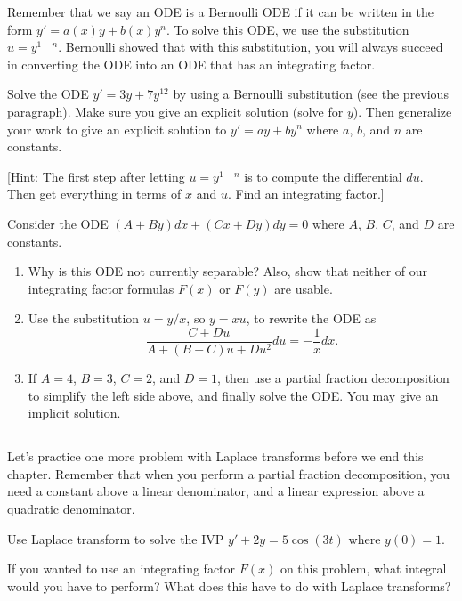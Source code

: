 Remember that we say an ODE is a Bernoulli ODE if it can be written in the form $y'=a(x) y +b(x) y^n$.  To solve this ODE, we use the substitution $u=y^{1-n}$. Bernoulli showed that with this substitution, you will always succeed in converting the ODE into an ODE that has an integrating factor. 
\begin{problem}
Solve the ODE $y'=3y+7y^{12}$ by using a Bernoulli substitution (see the previous paragraph). Make sure you give an explicit solution (solve for $y$). Then generalize your work to give an explicit solution to $y'=ay+by^n$ where $a$, $b$, and $n$ are constants. 

[Hint: The first step after letting  $u=y^{1-n}$ is to compute the differential $du$. Then get everything in terms of $x$ and $u$. Find an integrating factor.]
\end{problem}


\begin{problem}
Consider the ODE $(A+By)dx+(Cx+Dy)dy=0$ where $A$, $B$, $C$, and $D$ are constants. 
\begin{enumerate}
 \item Why is this ODE not currently separable? Also, show that neither of our integrating factor formulas $F(x)$ or $F(y)$ are usable. 
 \item Use the substitution $u=y/x$, so $y=xu$, to rewrite the ODE as 
$$\frac{C+Du}{A+(B+C)u+Du^2}du=-\frac{1}{x}dx.$$
 \item If $A=4$, $B=3$, $C=2$, and $D=1$, then use a partial fraction decomposition to simplify the left side above, and finally solve the ODE.  You may give an implicit solution.
\end{enumerate}
\end{problem}

\subsection*{\ideaC}
Let's practice one more problem with Laplace transforms before we end this chapter.  Remember that when you perform a partial fraction decomposition, you need a constant above a linear denominator, and a linear expression above a quadratic denominator. 
\begin{problem}
Use Laplace transform to solve the IVP $y'+2y=5\cos(3t)$ where $y(0)=1$.

If you wanted to use an integrating factor $F(x)$ on this problem, what integral would you have to perform? What does this have to do with Laplace transforms?
\end{problem}


